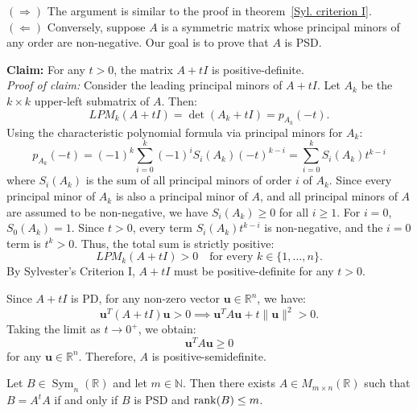 \begin{pfbox}
	$(\Rightarrow)$ The argument is similar to the proof in theorem~\eqref{Syl. criterion I}.\\
	$(\Leftarrow)$ Conversely, suppose $A$ is a symmetric matrix whose principal minors of any order are non-negative. Our goal is to prove that $A$ is PSD.

	\textbf{Claim:} For any $t > 0$, the matrix $A + tI$ is positive-definite.\\
	\textit{Proof of claim:} Consider the leading principal minors of $A+tI$. Let $A_k$ be the $k \times k$ upper-left submatrix of $A$. Then:
	$$
		LPM_k(A + tI) = \det(A_k + tI) = p_{A_k}(-t).
	$$
	Using the characteristic polynomial formula via principal minors for $A_k$:
	\[
		p_{A_k}(-t) = (-1)^k \sum_{i=0}^k (-1)^i S_i(A_k) (-t)^{k-i} = \sum_{i=0}^k S_i(A_k) t^{k-i}
	\]
	where $S_i(A_k)$ is the sum of all principal minors of order $i$ of $A_k$. Since every principal minor of $A_k$ is also a principal minor of $A$, and all principal minors of $A$ are assumed to be non-negative, we have $S_i(A_k) \ge 0$ for all $i \ge 1$. For $i = 0$, $S_0(A_k) = 1$. Since $t > 0$, every term $S_i(A_k) t^{k-i}$ is non-negative, and the $i=0$ term is $t^k > 0$. Thus, the total sum is strictly positive:
	$$
		LPM_k(A + tI) > 0 \quad \text{for every } k \in \{1, \dots, n\}.
	$$
	By Sylvester's Criterion I, $A + tI$ must be positive-definite for any $t > 0$.

	Since $A + tI$ is PD, for any non-zero vector $\mathbf{u} \in \mathbb{R}^n$, we have:
	$$
		\mathbf{u}^T (A + tI) \mathbf{u} > 0 \implies \mathbf{u}^T A \mathbf{u} + t \|\mathbf{u}\|^2 > 0.
	$$
	Taking the limit as $t \to 0^+$, we obtain:
	$$
		\mathbf{u}^T A \mathbf{u} \ge 0
	$$
	for any $\mathbf{u} \in \mathbb{R}^n$. Therefore, $A$ is positive-semidefinite.
\end{pfbox}


\begin{proposition}
Let $B\in \operatorname{Sym}_n(\mathbb{R})$ and let $m\in\mathbb{N}$. Then there exists
$A\in M_{m\times n}(\mathbb{R})$ such that $B=A^tA$ if and only if $B$ is PSD
and $\operatorname{rank}(B)\le m$.
\end{proposition}

